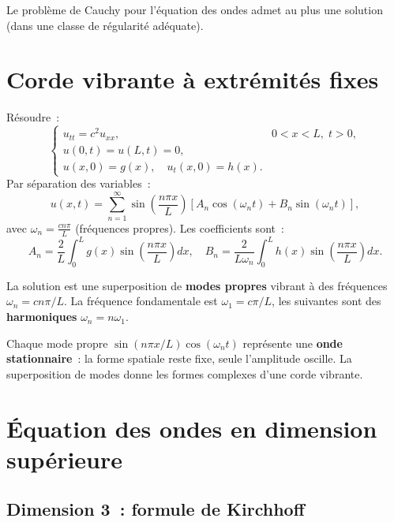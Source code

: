\begin{corollaire}[Unicit\'e]
Le probl\`eme de Cauchy pour l'\'equation des ondes admet au plus une solution
(dans une classe de r\'egularit\'e ad\'equate).
\end{corollaire}

\section{Corde vibrante \`a extr\'emit\'es fixes}

\begin{exemple}
R\'esoudre~:
\[
    \begin{cases}
        u_{tt} = c^2 u_{xx}, & 0 < x < L,\; t > 0,\\
        u(0,t) = u(L,t) = 0,\\
        u(x,0) = g(x), \quad u_t(x,0) = h(x).
    \end{cases}
\]
Par s\'eparation des variables~:
\[
    u(x,t) = \sum_{n=1}^{\infty} \sin\!\left(\frac{n\pi x}{L}\right)
    \left[A_n \cos(\omega_n t) + B_n \sin(\omega_n t)\right],
\]
avec $\omega_n = \frac{cn\pi}{L}$ (fr\'equences propres). Les coefficients sont~:
\[
    A_n = \frac{2}{L}\int_0^L g(x)\sin\!\left(\frac{n\pi x}{L}\right) dx,
    \quad
    B_n = \frac{2}{L\omega_n}\int_0^L h(x)\sin\!\left(\frac{n\pi x}{L}\right) dx.
\]

La solution est une superposition de \textbf{modes propres} vibrant \`a des
fr\'equences $\omega_n = cn\pi/L$. La fr\'equence fondamentale est
$\omega_1 = c\pi/L$, les suivantes sont des \textbf{harmoniques}
$\omega_n = n\omega_1$.
\end{exemple}

\begin{intuition}
Chaque mode propre $\sin(n\pi x/L)\cos(\omega_n t)$ repr\'esente une
\textbf{onde stationnaire}~: la forme spatiale reste fixe, seule l'amplitude
oscille. La superposition de modes donne les formes complexes d'une corde
vibrante.
\end{intuition}

\section{\'Equation des ondes en dimension sup\'erieure}

\subsection{Dimension 3~: formule de Kirchhoff}

